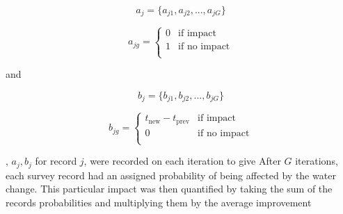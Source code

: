 \begin{center}
\begin{equation*}
a_j = \{a_{j1},a_{j2},...,a_{jG}\}
\end{equation*}

\begin{equation*}
a_{jg} =
\left\{
\begin{array}{ll}
      0 & \text{if impact}\\
      1 & \text{if no impact} \\
\end{array}
\right.
\end{equation*}

and

\begin{equation*}
b_j = \{b_{j1},b_{j2},...,b_{jG}\}
\end{equation*}

\begin{equation*}
b_{jg} =
\left\{
\begin{array}{ll}
      t_{\text{new}} - t_{\text{prev}} & \text{if impact} \\
      0 & \text{if no impact}\\
\end{array}
\right.
\end{equation*}
\end{center}


, $a_j,b_j$ for record $j$, were recorded on each iteration to give 
After $G$ iterations, each survey record had an assigned probability of being affected by the water change.
This particular impact was then quantified by taking the sum of the records probabilities and multiplying them by the average improvement 












